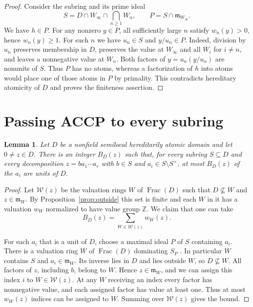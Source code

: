 \documentclass[11pt, letterpaper]{article}
\newtheorem{lemma}[theorem]{Lemma}
\theoremstyle{definition}
\theoremstyle{remark}
\DeclareMathOperator{\Frac}{Frac}
\begin{document}
\begin{proof}
    Consider the subring and its prime ideal
    \[
        S = D \cap W_{\infty} \cap \bigcap_{n \ge 1}W_n,
        \qquad P = S \cap \mathfrak{m}_{W_{\infty}}.
    \]
    We have $h \in P$.
    For any nonzero $y \in P$, all sufficiently large $n$ satisfy $w_n(y) > 0$, hence $w_n(y) \ge 1$.
    For such $n$ we have $u_n \in S$ and $y/u_n \in P$.
    Indeed, division by $u_n$ preserves membership in $D$, preserves the value at $W_{\infty}$ and all $W_i$ for $i \ne n$, and leaves a nonnegative value at $W_n$.
    Both factors of $y = u_n(y/u_n)$ are nonunits of $S$.
    Thus $P$ has no atoms, whereas a factorization of $h$ into atoms would place one of those atoms in $P$ by primality.
    This contradicts hereditary atomicity of $D$ and proves the finiteness assertion.
\end{proof}

\section{Passing ACCP to every subring}
\label{sec:hereditary}

\begin{lemma}
    \label{lem:unit-bound}
    Let $D$ be a nonfield semilocal hereditarily atomic domain and let $0 \ne z \in D$.
    There is an integer $B_D(z)$ such that, for every subring $S \subseteq D$ and every decomposition $z = b a_1 \cdots a_r$ with $b \in S$ and $a_i \in S \setminus S^{\times}$, at most $B_D(z)$ of the $a_i$ are units of $D$.
\end{lemma}

\begin{proof}
    Let $\mathcal{W}(z)$ be the valuation rings $W$ of $\Frac(D)$ such that $D \nsubseteq W$ and $z \in \mathfrak{m}_W$.
    By Proposition~\ref{prop:outside} this set is finite and each $W$ in it has a valuation $w_W$ normalized to have value group $\mathbb{Z}$.
    We claim that one can take
    \[
        B_D(z) = \sum_{W \in \mathcal{W}(z)} w_W(z).
    \]

    For each $a_i$ that is a unit of $D$, choose a maximal ideal $P$ of $S$ containing $a_i$.
    There is a valuation ring $W$ of $\Frac(D)$ dominating $S_P$ \cite{Stacks}.
    In particular $W$ contains $S$ and $a_i \in \mathfrak{m}_W$.
    Its inverse lies in $D$ and lies outside $W$, so $D \nsubseteq W$.
    All factors of $z$, including $b$, belong to $W$.
    Hence $z \in \mathfrak{m}_W$, and we can assign this index $i$ to $W \in \mathcal{W}(z)$.
    At any $W$ receiving an index every factor has nonnegative value, and each assigned factor has value at least one.
    Thus at most $w_W(z)$ indices can be assigned to $W$.
    Summing over $\mathcal{W}(z)$ gives the bound.
\end{proof}
\end{document}
